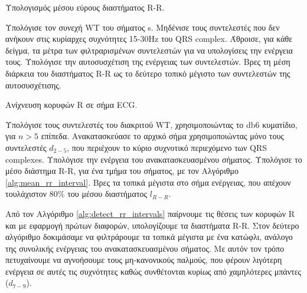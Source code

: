 \documentclass[11pt,a4paper]{article}
\begin{document}
\begin{algorithm}  
  \caption{Υπολογισμός μέσου εύρους διαστήματος R-R.}
  \label{alg:mean_rr_interval}  
  \begin{algorithmic}[1]  
  	
  	\State Υπολόγισε τον συνεχή WT του σήματος s.
  	\State Μηδένισε τους συντελεστές που δεν ανήκουν στις κυρίαρχες συχνότητες 15-30Hz του QRS complex.
  	\State Άθροισε, για κάθε δείγμα, τα μέτρα των φιλτραρισμένων συντελεστών για να υπολογίσεις την ενέργεια τους.
  	\State Υπολόγισε την αυτοσυσχέτιση της ενέργειας των συντελεστών.
  	\State Βρες τη μέση διάρκεια του διαστήματος R-R ως το δεύτερο τοπικό μέγιστο των συντελεστών της αυτοσυσχέτισης.
  	
  \end{algorithmic}  
\end{algorithm}

\begin{algorithm}  
  \caption{Ανίχνευση κορυφών R σε σήμα ECG.}
  \label{alg:detect_rr_intervals}  
  \begin{algorithmic}[1]  
  	
  	\State Υπολόγισε τους συντελεστές του διακριτού WT, χρησιμοποιώντας το db6 κυματίδιο, για $n>5$ επίπεδα.
  	\State Ανακατασκεύασε το αρχικό σήμα χρησιμοποιώντας μόνο τους συντελεστές $d_{2-5}$, που περιέχουν το κύριο συχνοτικό περιεχόμενο των QRS complexes.
  	\State Υπολόγισε την ενέργεια του ανακατασκευασμένου σήματος.
  	\State Υπολόγισε το μέσο διάστημα R-R, για ένα τμήμα του σήματος, με τον Αλγόριθμο \ref{alg:mean_rr_interval}.
  	\State Βρες τα τοπικά μέγιστα στο σήμα ενέργειας, που απέχουν τουλάχιστον $80\%$ του μέσου διαστήματος $l_{R-R}$.
  	
  \end{algorithmic}  
\end{algorithm}

Από τον Αλγόριθμο \ref{alg:detect_rr_intervals} παίρνουμε τις θέσεις των κορυφών R και με εφαρμογή πρώτων διαφορών, υπολογίζουμε τα διαστήματα R-R. Στον δεύτερο αλγόριθμο δοκιμάσαμε να φιλτράρουμε τα τοπικά μέγιστα με ένα κατώφλι, ανάλογο της συνολικής ενέργειας του ανακατασκευασμένου σήματος. Με αυτόν τον τρόπο πετυχαίνουμε να αγνοήσουμε τους μη-κανονικούς παλμούς, που φέρουν λιγότερη ενέργεια σε αυτές τις συχνότητες καθώς συνθέτονται κυρίως από χαμηλότερες μπάντες ($d_{7-9}$).
\end{document}
